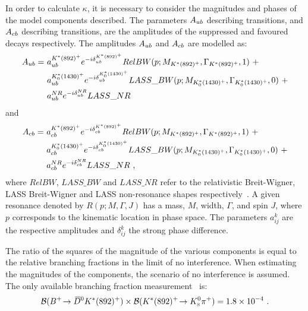 In order to calculate $\kappa$, it is necessary to consider the magnitudes and phases of the model components described. The parameters $A_{{u}{b}}$ describing \decay{\bquark}{\uquark} transitions, and $A_{{c}{b}}$ describing \decay{\bquark}{\cquark} transitions, are the amplitudes of the suppressed and favoured  decays respectively. The amplitudes $A_{{u}{b}}$ and $A_{{c}{b}}$ are modelled as:
\begin{align*}
A_{\uquark\bquark} =\ & a_{\uquark\bquark}^{K^*(892)^+}e^{-i\delta_{\uquark\bquark}^{K^*(892)^+}}RelBW(p;M_{K^*(892)^+},\Gamma_{K^*(892)^+},1)\ + \\
& a_{\uquark\bquark}^{K^*_0(1430)^+}e^{-i\delta_{\uquark\bquark}^{K^*_0(1430)^+}}LASS\_BW(p;M_{K^*_0(1430)^+},\Gamma_{K^*_0(1430)^+},0)\ + \\
& a_{\uquark\bquark}^{NR}e^{-i\delta_{\uquark\bquark}^{NR}}LASS\_NR
\end{align*}
and
\begin{align*}
A_{\cquark\bquark} =\ & a_{\cquark\bquark}^{K^*(892)^+}e^{-i\delta_{\cquark\bquark}^{K^*(892)^+}}RelBW(p;M_{K^*(892)^+},\Gamma_{K^*(892)^+},1)\ + \\
& a_{\cquark\bquark}^{K^*_0(1430)^+}e^{-i\delta_{\cquark\bquark}^{K^*_0(1430)^+}}LASS\_BW(p;M_{K^*_0(1430)^+},\Gamma_{K^*_0(1430)^+},0)\ + \\
& a_{\cquark\bquark}^{NR}e^{-i\delta_{\cquark\bquark}^{NR}}LASS\_NR \text{ ,}
\end{align*}
where $RelBW$, $LASS\_BW$ and $LASS\_NR$ refer to the relativistic Breit-Wigner, LASS Breit-Wigner and LASS non-resonance shapes respectively~\cite{LASS}. A given resonance denoted by $R(p;M,\Gamma,J)$ has a mass, $M$, width, $\Gamma$, and spin $J$, where $p$ corresponds to the kinematic location in \decay{\Bm}{\D\KS\pim} phase space. The parameters $a_{ij}^k$ are the respective amplitudes and $\delta_{ij}^k$ the strong phase difference.

The ratio of the squares of the magnitude of the various components is equal to the relative branching fractions in the limit of no interference. When estimating the magnitudes of the components, the scenario of no interference is assumed. The only available branching fraction measurement~\cite{PDG2016} is:
\begin{equation*}
{\ensuremath{\mathcal{B}}}({{{B}^+}}\!\rightarrow {\ensuremath{{\kern 0.2em\overline{\kern -0.2em D}{}}{}^0}} K^*(892)^+) \times {\ensuremath{\mathcal{B}}}(K^*(892)^+\!\rightarrow {\ensuremath{{K}^0_{\mathrm{ \scriptscriptstyle S}}}}{\ensuremath{{\pi}^+}}) = 1.8 \times 10^{-4} \text{ .}
\end{equation*}

